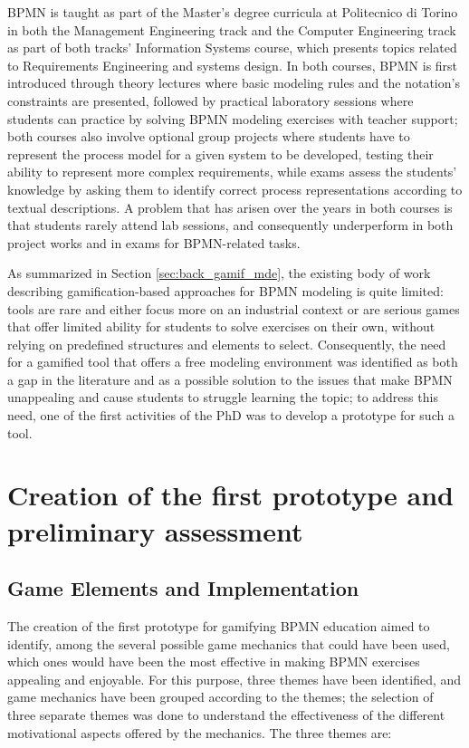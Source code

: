 BPMN is taught as part of the Master's degree curricula at Politecnico di Torino in both the Management Engineering track and the Computer Engineering track as part of both tracks' Information Systems course, which presents topics related to Requirements Engineering and systems design. In both courses, BPMN is first introduced through theory lectures where basic modeling rules and the notation's constraints are presented, followed by practical laboratory sessions where students can practice by solving BPMN modeling exercises with teacher support; both courses also involve optional group projects where students have to represent the process model for a given system to be developed, testing their ability to represent more complex requirements, while exams assess the students' knowledge by asking them to identify correct process representations according to textual descriptions. A problem that has arisen over the years in both courses is that students rarely attend lab sessions, and consequently underperform in both project works and in exams for BPMN-related tasks.

As summarized in Section \ref{sec:back_gamif_mde}, the existing body of work describing gamification-based approaches for BPMN modeling is quite limited: tools are rare and either focus more on an industrial context or are serious games that offer limited ability for students to solve exercises on their own, without relying on predefined structures and elements to select. Consequently, the need for a gamified tool that offers a free modeling environment was identified as both a gap in the literature and as a possible solution to the issues that make BPMN unappealing and cause students to struggle learning the topic; to address this need, one of the first activities of the PhD was to develop a prototype for such a tool.



\section{Creation of the first prototype and preliminary assessment}

\subsection{Game Elements and Implementation}
\label{sec:proto_tool}

The creation of the first prototype for gamifying BPMN education aimed to identify, among the several possible game mechanics that could have been used, which ones would have been the most effective in making BPMN exercises appealing and enjoyable. For this purpose, three themes have been identified, and game mechanics have been grouped according to the themes; the selection of three separate themes was done to understand the effectiveness of the different motivational aspects offered by the mechanics. The three themes are:\\

